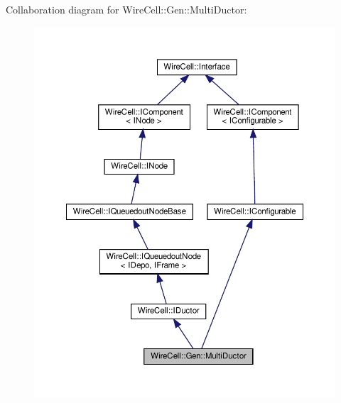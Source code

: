 Collaboration diagram for Wire\+Cell\+:\+:Gen\+:\+:Multi\+Ductor\+:
\nopagebreak
\begin{figure}[H]
\begin{center}
\leavevmode
\includegraphics[width=350pt]{class_wire_cell_1_1_gen_1_1_multi_ductor__coll__graph}
\end{center}
\end{figure}
